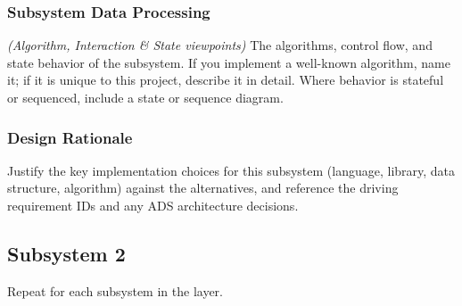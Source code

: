 \subsubsection{Subsystem Data Processing}
\textit{(Algorithm, Interaction \& State viewpoints)} The algorithms, control flow, and state behavior of the subsystem. If you implement a well-known algorithm, name it; if it is unique to this project, describe it in detail. Where behavior is stateful or sequenced, include a state or sequence diagram.

\subsubsection{Design Rationale}
Justify the key implementation choices for this subsystem (language, library, data structure, algorithm) against the alternatives, and reference the driving requirement IDs and any ADS architecture decisions.

\subsection{Subsystem 2}
Repeat for each subsystem in the layer.
